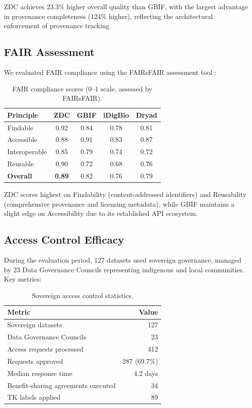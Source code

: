 \documentclass[11pt,a4paper]{article}
\begin{document}
ZDC achieves 23.3\% higher overall quality than GBIF, with the largest advantage in provenance completeness (124\% higher), reflecting the architectural enforcement of provenance tracking.

\subsection{FAIR Assessment}

We evaluated FAIR compliance using the FAIRsFAIR assessment tool \citep{devaraju2021fairsfair}:

\begin{table}[H]
\centering
\caption{FAIR compliance scores (0--1 scale, assessed by FAIRsFAIR).}
\label{tab:fair}
\begin{tabular}{@{}lcccc@{}}
\toprule
\textbf{Principle} & \textbf{ZDC} & \textbf{GBIF} & \textbf{iDigBio} & \textbf{Dryad} \\
\midrule
Findable & 0.92 & 0.84 & 0.78 & 0.81 \\
Accessible & 0.88 & 0.91 & 0.83 & 0.87 \\
Interoperable & 0.85 & 0.79 & 0.74 & 0.72 \\
Reusable & 0.90 & 0.72 & 0.68 & 0.76 \\
\midrule
\textbf{Overall} & \textbf{0.89} & 0.82 & 0.76 & 0.79 \\
\bottomrule
\end{tabular}
\end{table}

ZDC scores highest on Findability (content-addressed identifiers) and Reusability (comprehensive provenance and licensing metadata), while GBIF maintains a slight edge on Accessibility due to its established API ecosystem.

\subsection{Access Control Efficacy}

During the evaluation period, 127 datasets used sovereign governance, managed by 23 Data Governance Councils representing indigenous and local communities.
Key metrics:

\begin{table}[H]
\centering
\caption{Sovereign access control statistics.}
\label{tab:sovereign}
\begin{tabular}{@{}lr@{}}
\toprule
\textbf{Metric} & \textbf{Value} \\
\midrule
Sovereign datasets & 127 \\
Data Governance Councils & 23 \\
Access requests processed & 412 \\
Requests approved & 287 (69.7\%) \\
Median response time & 4.2 days \\
Benefit-sharing agreements executed & 34 \\
TK labels applied & 89 \\
\bottomrule
\end{tabular}
\end{table}
\end{document}
